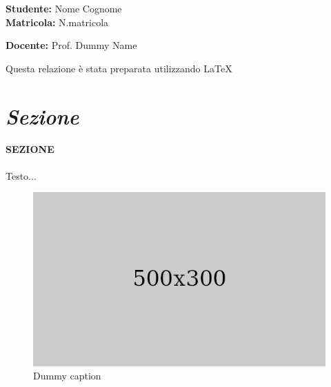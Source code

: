 \documentclass[a4paper, 12pt]{report}
\begin{document}
\thispagestyle{empty}
 \begin{flushright}
  \LARGE{\textbf{Studente:} Nome Cognome} \\
  \LARGE{\textbf{Matricola:} N.matricola}
 \end{flushright}
 \vspace{6cm}
 \begin{center}
 \end{center}
 \vspace{9cm}
 \begin{flushright}
  \LARGE{\textbf{Docente:} Prof. Dummy Name}
 \end{flushright}
 \vspace{2cm}
 \begin{center}
 Questa relazione è stata preparata utilizzando \LaTeX
 \end{center}
 \part* {\textit {Sezione}}
 \subsection*{SEZIONE}
 \vspace{0.5cm}
 Testo...
  \vspace{1cm}
   \begin{figure}[htbp]
    \centering
    \includegraphics[keepaspectratio]{img/dummy}
    \caption{Dummy caption}
   \end{figure}
   \vspace{3cm}
  
  
\end{document}
